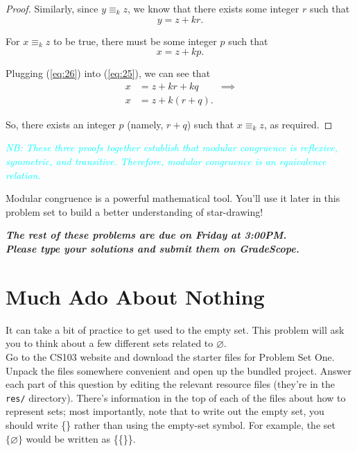 \documentclass{article}
\renewcommand{\(}{\left(}
\renewcommand{\)}{\right)}
\theoremstyle{plain}
\theoremstyle{plain}
\theoremstyle{definition}
\begin{document}
\begin{enumerate}[label*=\roman*.,ref=\roman*]
\begin{shaded}
\begin{proof}
	Similarly, since $y \equiv_k z$, we know that there exists some integer $r$ such that
	\begin{equation} \label{eq:26}
	y = z + kr.
	\end{equation}
	
	For $x \equiv_k z$ to be true, there must be some integer $p$ such that
	\begin{equation}
	x = z + kp.
	\end{equation}
	
	Plugging (\ref{eq:26}) into (\ref{eq:25}), we can see that
	\begin{equation}
	\begin{aligned}
		x & = z + kr + kq & \implies \\
		x & = z + k(r + q).
	\end{aligned}
	\end{equation}
	
	So, there exists an integer $p$ (namely, $r + q$) such that $x \equiv_k z$, as required.
	
\end{proof}
\textit{\textcolor{cyan}{NB: These three proofs together establish that modular congruence is reflexive, symmetric, and transitive. Therefore, modular congruence is an equivalence relation.}}
\end{shaded}

\end{enumerate}

Modular congruence is a powerful mathematical tool. You'll use it later in this problem set to build a better
understanding of star-drawing!

\pagebreak

\begin{center}
\textit{\textbf{The rest of these problems are due on Friday at 3:00PM. \\ Please type your solutions and submit them on GradeScope.}}
\end{center}

\section{Much Ado About Nothing}

It can take a bit of practice to get used to the empty set. This problem will ask you to think about a few different sets related to $\varnothing$. \\

Go to the CS103 website and download the starter files for Problem Set One. Unpack the files somewhere convenient and open up the bundled project. Answer each part of this question by editing the relevant resource files (they're in the \texttt{res/} directory). There's information in the top of each of the files about how to represent sets; most importantly, note that to write out the empty set, you should write \{\} rather than using the empty-set symbol. For example, the set $\{\varnothing\}$ would be written as \{\{\}\}.
\end{document}
